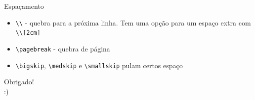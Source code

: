\documentclass[12pt]{beamer}
\begin{document}
\begin{frame}[fragile]{Espaçamento}

\begin{itemize}
  \item \verb+\\+ - quebra para a próxima linha. Tem uma opção para um espaço extra com \verb+\\[2cm]+
  \item \verb+\pagebreak+ - quebra de página
  \item \verb+\bigskip+, \verb+\medskip+ e \verb+\smallskip+ pulam certos espaço
\end{itemize}

\end{frame}

\begin{frame}
  \begin{center}
    \large Obrigado!\\
    :)
  \end{center}
\end{frame}
\end{document}
